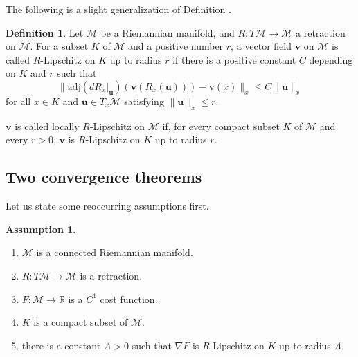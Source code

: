 \documentclass{amsart}
\newcommand{\R}{\mathbb{R}}
\newcommand{\M}{\mathcal{M}}
\newcommand{\adj}{\mathrm{adj}}
\theoremstyle{plain}
\theoremstyle{definition}
\newtheorem{definition}[theorem]{Definition}
\newtheorem{assumption}[theorem]{Assumption}
\theoremstyle{remark}
\numberwithin{theorem}{section}
\numberwithin{equation}{section}
\begin{document}
The following is a slight generalization of Definition \cite[Definition 2.3]{XYW-2024}. 

\begin{definition}\label{def-Lipschitz}
Let $\M$ be a Riemannian manifold, and $R:T\M \rightarrow \M$ a retraction on $\M$. For a subset $K$ of $\M$ and a positive number $r$, a vector field $\mathbf{v}$ on $\M$ is called $R$-Lipschitz on $K$ up to radius $r$ if there is a positive constant $C$ depending on $K$ and $r$ such that 
\begin{equation}\label{eq-def-Lipschitz}
\|\adj(dR_x|_{\mathbf{u}})(\mathbf{v}(R_x(\mathbf{u}))) - \mathbf{v}(x)\|_x \leq C\|\mathbf{u}\|_x
\end{equation}
for all $x \in K$ and $\mathbf{u} \in T_x \M$ satisfying $\|\mathbf{u}\|_x \leq r$.

$\mathbf{v}$ is called locally $R$-Lipschitz on $\M$ if, for every compact subset $K$ of $\M$ and every $r>0$, $\mathbf{v}$ is $R$-Lipschitz on $K$ up to radius $r$.
\end{definition}

\subsection{Two convergence theorems} Let us state some reoccurring assumptions first.

\begin{assumption}\label{assumption-cost-function}
\begin{enumerate}
  \item $\M$ is a connected Riemannian manifold.
	\item $R:T\M \rightarrow \M$ is a retraction.
	\item $F:\M\rightarrow \R$ is a $C^1$ cost function.
	\item $K$ is a compact subset of $\M$.
	\item there is a constant $A>0$ such that $\nabla F$ is $R$-Lipschitz on $K$ up to radius $A$. 
\end{enumerate}
\end{assumption}
\end{document}
